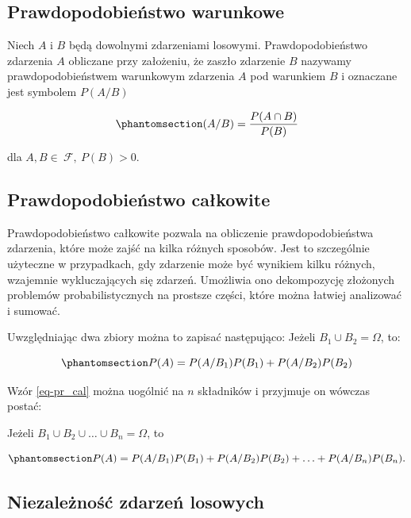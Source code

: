 \documentclass[
  letterpaper,
  DIV=11,
  numbers=noendperiod]{scrreprt}
\begin{document}
\subsection{Prawdopodobieństwo
warunkowe}\label{prawdopodobieux144stwo-warunkowe}

Niech \(A\) i \(B\) będą dowolnymi zdarzeniami losowymi.
Prawdopodobieństwo zdarzenia \(A\) obliczane przy założeniu, że zaszło
zdarzenie \(B\) nazywamy prawdopodobieństwem warunkowym zdarzenia \(A\)
pod warunkiem \(B\) i oznaczane jest symbolem \(P(A/B)\)

\begin{equation}\phantomsection\label{eq-pr_war}{ (A/B)= \frac{P(A \cap B)}{P(B)}}\end{equation}

dla \(A, B \in \ \mathcal{F}, \ P(B) > 0.\)

\subsection{Prawdopodobieństwo
całkowite}\label{prawdopodobieux144stwo-caux142kowite}

Prawdopodobieństwo całkowite pozwala na obliczenie prawdopodobieństwa
zdarzenia, które może zajść na kilka różnych sposobów. Jest to
szczególnie użyteczne w przypadkach, gdy zdarzenie może być wynikiem
kilku różnych, wzajemnie wykluczających się zdarzeń. Umożliwia ono
dekompozycję złożonych problemów probabilistycznych na prostsze części,
które można łatwiej analizować i sumować.

Uwzględniając dwa zbiory można to zapisać następująco: Jeżeli
\(B_1 \cup B_2 = \Omega\), to:

\begin{equation}\phantomsection\label{eq-pr_cal}{ P(A)= P(A/B_1)P(B_1)+P(A/B_2)P(B_2)}\end{equation}

Wzór \ref{eq-pr_cal} można uogólnić na \(n\) składników i przyjmuje on
wówczas postać:

Jeżeli \(B_1 \cup B_2 \cup \ldots \cup B_n =\Omega\), to

\begin{equation}\phantomsection\label{eq-pr_cal_n}{ P(A)= P(A/B_1)P(B_1)+P(A/B_2)P(B_2)+ \ldots + P(A/B_n)P(B_n).}\end{equation}

\subsection{Niezależność zdarzeń
losowych}\label{niezaleux17cnoux15bux107-zdarzeux144-losowych}
\end{document}
